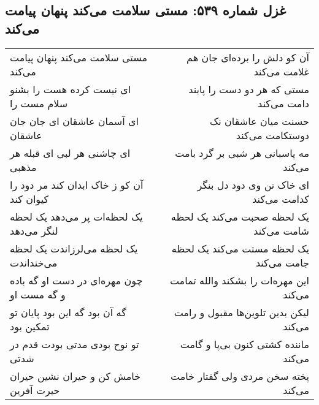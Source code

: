 \begin{center}
\section*{غزل شماره ۵۳۹: مستی سلامت می‌کند پنهان پیامت می‌کند}
\label{sec:0539}
\begin{longtable}{l p{0.5cm} r}
مستی سلامت می‌کند پنهان پیامت می‌کند
&&
آن کو دلش را برده‌ای جان هم غلامت می‌کند
\\
ای نیست کرده هست را بشنو سلام مست را
&&
مستی که هر دو دست را پابند دامت می‌کند
\\
ای آسمان عاشقان ای جان جان عاشقان
&&
حسنت میان عاشقان نک دوستکامت می‌کند
\\
ای چاشنی هر لبی ای قبله هر مذهبی
&&
مه پاسبانی هر شبی بر گرد بامت می‌کند
\\
آن کو ز خاک ابدان کند مر دود را کیوان کند
&&
ای خاک تن وی دود دل بنگر کدامت می‌کند
\\
یک لحظه‌ات پر می‌دهد یک لحظه لنگر می‌دهد
&&
یک لحظه صحبت می‌کند یک لحظه شامت می‌کند
\\
یک لحظه می‌لرزاندت یک لحظه می‌خنداندت
&&
یک لحظه مستت می‌کند یک لحظه جامت می‌کند
\\
چون مهره‌ای در دست او گه باده و گه مست او
&&
این مهره‌ات را بشکند والله تمامت می‌کند
\\
گه آن بود گه این بود پایان تو تمکین بود
&&
لیکن بدین تلوین‌ها مقبول و رامت می‌کند
\\
تو نوح بودی مدتی بودت قدم در شدتی
&&
ماننده کشتی کنون بی‌پا و گامت می‌کند
\\
خامش کن و حیران نشین حیران حیرت آفرین
&&
پخته سخن مردی ولی گفتار خامت می‌کند
\\
\end{longtable}
\end{center}
